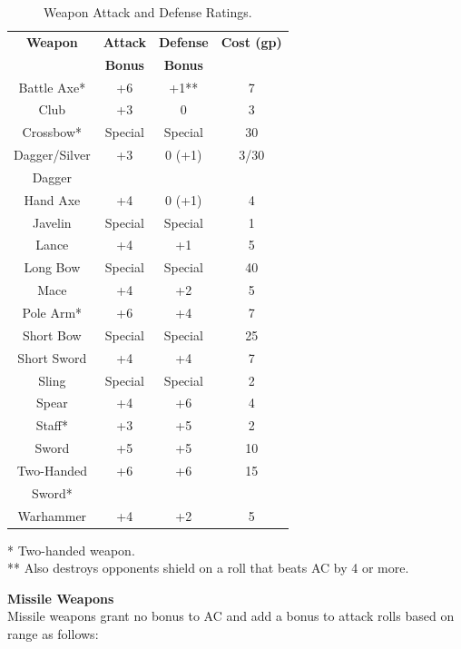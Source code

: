 \documentclass[letterpaper,sansserif,tightsqueeze]{rpg-module}
\begin{document}
\begin{table}[h!]
	\centering
	\begin{tabular}{|c|c|c|c|}
		\hline
		\textbf{Weapon}	& \textbf{Attack}	& \textbf{Defense}	& \textbf{Cost (gp)}	\\
		\textbf{} 		& \textbf{Bonus}	& \textbf{Bonus}		& \textbf{}				\\ \hline
		Battle Axe*				& +6		& +1**		& 7 	\\ \hline
		Club					& +3		& 0			& 3  	\\ \hline
		Crossbow*				& Special	& Special	& 30  	\\ \hline
		Dagger/Silver			& +3		& 0 (+1)	& 3/30  \\
		Dagger					& 			& 			&		\\ \hline
		Hand Axe				& +4		& 0 (+1)	& 4 	\\ \hline
		Javelin					& Special	& Special	& 1 	\\ \hline
		Lance					& +4		& +1		& 5 	\\ \hline
		Long Bow				& Special	& Special	& 40 	\\ \hline
		Mace					& +4		& +2		& 5 	\\ \hline
		Pole Arm*				& +6		& +4		& 7 	\\ \hline
		Short Bow				& Special	& Special	& 25 	\\ \hline
		Short Sword				& +4		& +4		& 7 	\\ \hline
		Sling					& Special	& Special	& 2 	\\ \hline
		Spear					& +4		& +6		& 4 	\\ \hline
		Staff*					& +3		& +5		& 2 	\\ \hline
		Sword					& +5		& +5		& 10 	\\ \hline
		Two-Handed				& +6		& +6		& 15 	\\
		Sword*					& 			& 			&  		\\ \hline
		Warhammer				& +4		& +2		& 5 	\\ \hline
	\end{tabular}
	\caption{Weapon Attack and Defense Ratings.}
	\label{table:WeaponAttackAndDefenseRatings}
\end{table}
\vspace{-0.5cm}
* Two-handed weapon.\\
** Also destroys opponents shield on a roll that beats AC by 4 or more.

\textbf{Missile Weapons}\\
Missile weapons grant no bonus to AC and add a bonus to attack rolls based on range as follows:
\end{document}
